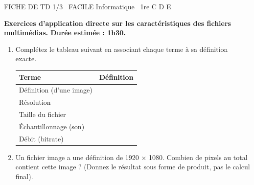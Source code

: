\documentclass[11pt]{article}
\begin{document}
\begin{tcolorbox}[enhanced,colback=popink,colframe=popink,arc=10pt,boxrule=0pt,left=12pt,right=12pt,top=9pt,bottom=9pt]
{\color{white}\popxbold\small FICHE DE TD 1/3 \textbullet\ FACILE \hfill Informatique \textbullet\ 1re C D E\par}
\end{tcolorbox}
\vspace{4pt}
\textbf{Exercices d'application directe sur les caractéristiques des fichiers multimédias. Durée estimée : 1h30.}

\begin{exercice}
\begin{enumerate}
    \item Complétez le tableau suivant en associant chaque terme à sa définition exacte.
    \begin{tabular}{|p{3.5cm}|p{11cm}|}
        \hline
        \textbf{Terme} & \textbf{Définition} \\ \hline
        Définition (d'une image) & \\ \hline
        Résolution & \\ \hline
        Taille du fichier & \\ \hline
        Échantillonnage (son) & \\ \hline
        Débit (bitrate) & \\ \hline
    \end{tabular}
    \item Un fichier image a une définition de \SI{1920}{} $\times$ \SI{1080}{}. Combien de pixels au total contient cette image ? (Donnez le résultat sous forme de produit, pas le calcul final).
\end{enumerate}
\end{exercice}
\end{document}
